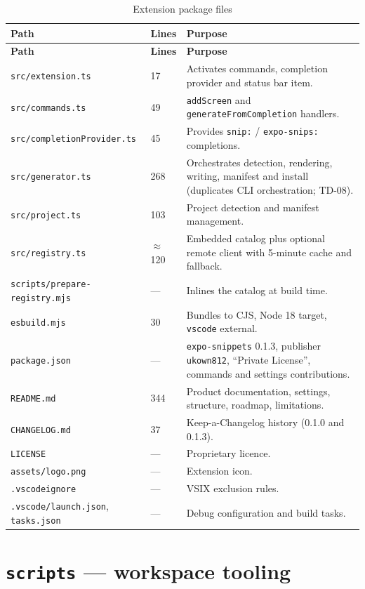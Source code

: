 \begin{longtable}{@{}L{6cm}L{2.2cm}L{6.2cm}@{}}
\caption{Extension package files}\\
\toprule
\textbf{Path} & \textbf{Lines} & \textbf{Purpose} \\
\midrule
\endfirsthead
\toprule
\textbf{Path} & \textbf{Lines} & \textbf{Purpose} \\
\midrule
\endhead
\texttt{src/extension.ts} & 17 & Activates commands, completion provider and status
bar item. \\
\texttt{src/commands.ts} & 49 & \texttt{addScreen} and
\texttt{generateFromCompletion} handlers. \\
\texttt{src/completionProvider.ts} & 45 & Provides \texttt{snip:} /
\texttt{expo-snips:} completions. \\
\texttt{src/generator.ts} & 268 & Orchestrates detection, rendering, writing,
manifest and install (duplicates CLI orchestration; TD-08). \\
\texttt{src/project.ts} & 103 & Project detection and manifest management. \\
\texttt{src/registry.ts} & $\approx$120 & Embedded catalog plus optional remote
client with 5-minute cache and fallback. \\
\texttt{scripts/prepare-registry.mjs} & --- & Inlines the catalog at build time. \\
\texttt{esbuild.mjs} & 30 & Bundles to CJS, Node 18 target, \texttt{vscode}
external. \\
\texttt{package.json} & --- & \texttt{expo-snippets} 0.1.3, publisher
\texttt{ukown812}, ``Private License'', commands and settings contributions. \\
\texttt{README.md} & 344 & Product documentation, settings, structure, roadmap,
limitations. \\
\texttt{CHANGELOG.md} & 37 & Keep-a-Changelog history (0.1.0 and 0.1.3). \\
\texttt{LICENSE} & --- & Proprietary licence. \\
\texttt{assets/logo.png} & --- & Extension icon. \\
\texttt{.vscodeignore} & --- & VSIX exclusion rules. \\
\texttt{.vscode/launch.json}, \texttt{tasks.json} & --- & Debug configuration and
build tasks. \\
\bottomrule
\end{longtable}

\section{\texttt{scripts} --- workspace tooling}

